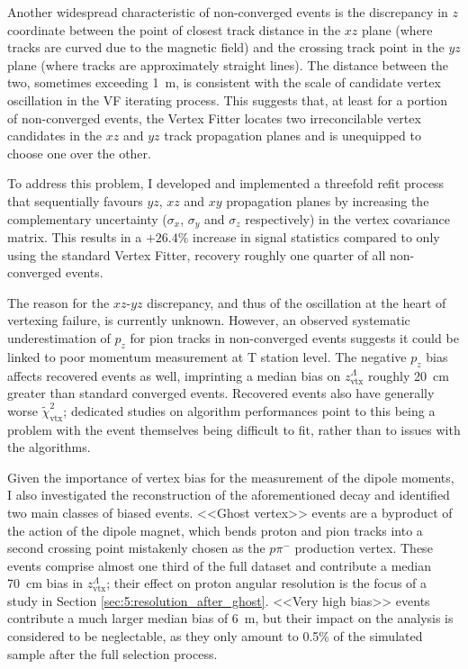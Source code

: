Another widespread characteristic of non-converged events is the discrepancy in $z$ coordinate between the point of closest track distance in the $xz$ plane (where tracks are curved due to the magnetic field) and the crossing track point in the $yz$ plane (where tracks are approximately straight lines).
The distance between the two, sometimes exceeding \SI{1}{\meter}, is consistent with the scale of candidate vertex oscillation in the VF iterating process.
This suggests that, at least for a portion of non-converged events, the Vertex Fitter locates two irreconcilable vertex candidates in the $xz$ and $yz$ track propagation planes and is unequipped to choose one over the other.

To address this problem, I developed and implemented a threefold refit process that sequentially favours $yz$, $xz$ and $xy$ propagation planes by increasing the complementary uncertainty ($\sigma_x$, $\sigma_y$ and $\sigma_z$ respectively) in the vertex covariance matrix.
This results in a $+26.4\%$ increase in signal statistics compared to only using the standard Vertex Fitter, recovery roughly one quarter of all non-converged \demonstratorshort events.

The reason for the $xz$-$yz$ discrepancy, and thus of the oscillation at the heart of vertexing failure, is currently unknown.
However, an observed systematic underestimation of $p_z$ for pion tracks in non-converged events suggests it could be linked to poor momentum measurement at T station level.
The negative $p_z$ bias affects recovered events as well, imprinting a median bias on $z_\text{vtx}^\Lambda$ roughly \SI{20}{\centi\meter} greater than standard converged events.
Recovered events also have generally worse $\tilde{\chi}^2_\text{vtx}$; dedicated studies on algorithm performances point to this being a problem with the event themselves being difficult to fit, rather than to issues with the algorithms.

Given the importance of \lambdadecay vertex bias for the measurement of the \lz dipole moments, I also investigated the reconstruction of the aforementioned decay and identified two main classes of biased events.
<<Ghost vertex>> events are a byproduct of the action of the dipole magnet, which bends proton and pion tracks into a second crossing point mistakenly chosen as the $p\pi^-$ production vertex.
These events comprise almost one third of the full dataset and contribute a median \SI{70}{\centi\meter} bias in $z_\text{vtx}^\Lambda$;
their effect on proton angular resolution is the focus of a study in Section \ref{sec:5:resolution_after_ghost}.
<<Very high bias>> events contribute a much larger median bias of \SI{6}{\meter}, but their impact on the \demonstratorshort analysis is considered to be neglectable, as they only amount to 0.5\% of the simulated sample after the full selection process.